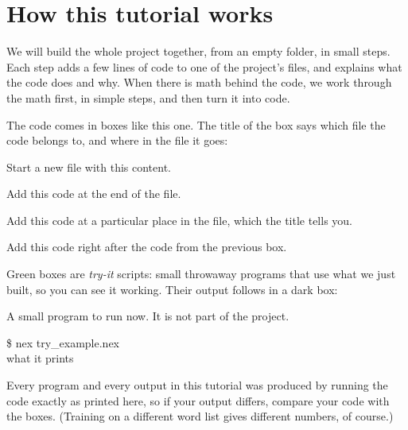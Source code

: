 \documentclass[11pt,a4paper,oneside,openany]{book}
\begin{document}
\section{How this tutorial works}

We will build the whole project together, from an empty folder, in small
steps. Each step adds a few lines of code to one of the project's files,
and explains what the code does and why. When there is math behind the
code, we work through the math first, in simple steps, and then turn it
into code.

The code comes in boxes like this one. The title of the box says which
file the code belongs to, and where in the file it goes:

\begin{tcolorbox}[codebox, title={\textbf{New file}\enspace\texttt{example.nex}}]
\small Start a new file with this content.
\end{tcolorbox}
\begin{tcolorbox}[codebox, title={\texttt{example.nex}\enspace\textendash\enspace add at the end}]
\small Add this code at the end of the file.
\end{tcolorbox}
\begin{tcolorbox}[codebox, title={\texttt{example.nex}\enspace\textendash\enspace add before the line ...}]
\small Add this code at a particular place in the file, which the title tells you.
\end{tcolorbox}
\begin{tcolorbox}[codebox, title={\texttt{example.nex}\enspace\textendash\enspace continued}]
\small Add this code right after the code from the previous box.
\end{tcolorbox}

Green boxes are \emph{try-it} scripts: small throwaway programs that use
what we just built, so you can see it working. Their output follows in a
dark box:

\begin{tcolorbox}[trybox, title={\textbf{Try it}\enspace\texttt{try\_example.nex}}]
\small A small program to run now. It is not part of the project.
\end{tcolorbox}
\begin{tcolorbox}[outbox]
{\ttfamily\footnotesize\color{outfg}\$ nex try\_example.nex\\what it prints}
\end{tcolorbox}

Every program and every output in this tutorial was produced by running
the code exactly as printed here, so if your output differs, compare your
code with the boxes. (Training on a different word list gives different
numbers, of course.)
\end{document}
